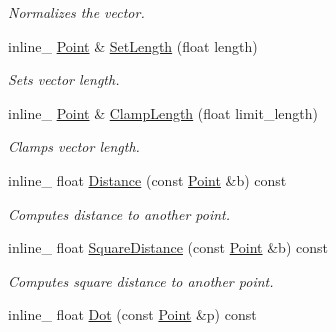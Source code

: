 \begin{DoxyCompactItemize}
\begin{DoxyCompactList}\small\item\em Normalizes the vector. \end{DoxyCompactList}\item 
inline\+\_\+ \hyperlink{classPoint}{Point} \& \hyperlink{classPoint_ae93aefb6d3b029526eea4c9d814c7900}{Set\+Length} (float length)\hypertarget{classPoint_ae93aefb6d3b029526eea4c9d814c7900}{}\label{classPoint_ae93aefb6d3b029526eea4c9d814c7900}

\begin{DoxyCompactList}\small\item\em Sets vector length. \end{DoxyCompactList}\item 
inline\+\_\+ \hyperlink{classPoint}{Point} \& \hyperlink{classPoint_a598f4dc4c6b260340c0c7ebc5bdefe03}{Clamp\+Length} (float limit\+\_\+length)\hypertarget{classPoint_a598f4dc4c6b260340c0c7ebc5bdefe03}{}\label{classPoint_a598f4dc4c6b260340c0c7ebc5bdefe03}

\begin{DoxyCompactList}\small\item\em Clamps vector length. \end{DoxyCompactList}\item 
inline\+\_\+ float \hyperlink{classPoint_a4417734642ad9eb892b76000dc77e146}{Distance} (const \hyperlink{classPoint}{Point} \&b) const \hypertarget{classPoint_a4417734642ad9eb892b76000dc77e146}{}\label{classPoint_a4417734642ad9eb892b76000dc77e146}

\begin{DoxyCompactList}\small\item\em Computes distance to another point. \end{DoxyCompactList}\item 
inline\+\_\+ float \hyperlink{classPoint_aaae2329125f71f5b9e4037249cc95cb2}{Square\+Distance} (const \hyperlink{classPoint}{Point} \&b) const \hypertarget{classPoint_aaae2329125f71f5b9e4037249cc95cb2}{}\label{classPoint_aaae2329125f71f5b9e4037249cc95cb2}

\begin{DoxyCompactList}\small\item\em Computes square distance to another point. \end{DoxyCompactList}\item 
inline\+\_\+ float \hyperlink{classPoint_a2f05050d582a3b655ccb4799ecbf1f00}{Dot} (const \hyperlink{classPoint}{Point} \&p) const \hypertarget{classPoint_a2f05050d582a3b655ccb4799ecbf1f00}{}\label{classPoint_a2f05050d582a3b655ccb4799ecbf1f00}


\end{DoxyCompactItemize}
